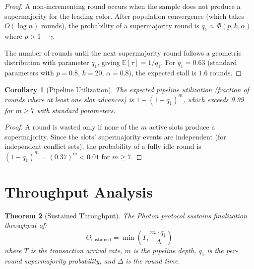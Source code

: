 \documentclass[11pt,a4paper]{article}
\newtheorem{theorem}{Theorem}[section]
\newtheorem{corollary}[theorem]{Corollary}
\begin{document}
\begin{proof}
A non-incrementing round occurs when the sample does not produce a supermajority for
the leading color. After population convergence (which takes $O(\log n)$ rounds), the
probability of a supermajority round is $q_1 \approx \Phi(p, k, \alpha)$ where $p > 1 - \gamma$.

The number of rounds until the next supermajority round follows a geometric distribution
with parameter $q_1$, giving $\mathbb{E}[\tau] = 1/q_1$. For $q_1 = 0.63$ (standard
parameters with $p = 0.8$, $k = 20$, $\alpha = 0.8$), the expected stall is $1.6$ rounds.
\end{proof}

\begin{corollary}[Pipeline Utilization]
\label{cor:utilization}
The expected pipeline utilization (fraction of rounds where at least one slot advances)
is $1 - (1 - q_1)^m$, which exceeds 0.99 for $m \geq 7$ with standard parameters.
\end{corollary}

\begin{proof}
A round is wasted only if none of the $m$ active slots produce a supermajority. Since
the slots' supermajority events are independent (for independent conflict sets), the
probability of a fully idle round is $(1 - q_1)^m = (0.37)^m < 0.01$ for $m \geq 7$.
\end{proof}

\section{Throughput Analysis}
\label{sec:throughput}

\begin{theorem}[Sustained Throughput]
\label{thm:throughput}
The Photon protocol sustains finalization throughput of:
\[
\Theta_{\text{sustained}} = \min\left(T, \frac{m \cdot q_1}{\Delta}\right)
\]
where $T$ is the transaction arrival rate, $m$ is the pipeline depth, $q_1$ is the
per-round supermajority probability, and $\Delta$ is the round time.
\end{theorem}
\end{document}
